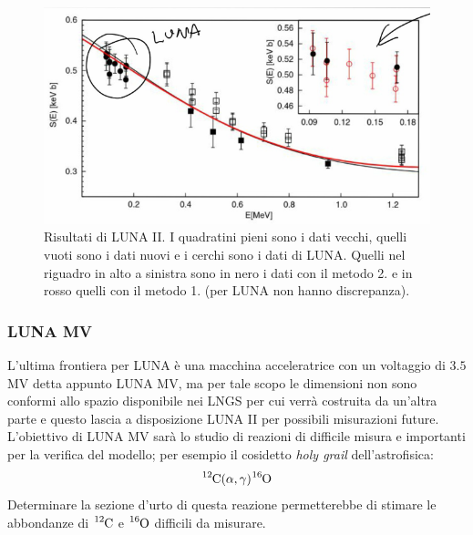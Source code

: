 \begin{figure}[!h]
	\centering
	\includegraphics[scale=0.7]{Immagini/0415_SE2.png}
	\caption{Risultati di LUNA II. I quadratini pieni sono i dati vecchi, quelli vuoti sono i dati nuovi e i cerchi sono i dati di LUNA. Quelli nel riguadro in alto a sinistra sono in nero i dati con il metodo 2. e in rosso quelli con il metodo 1. (per LUNA non hanno discrepanza).}
	\label{0415_lunaii}
\end{figure}

\subsubsection{LUNA MV}
L'ultima frontiera per LUNA è una macchina acceleratrice con un voltaggio di $3.5$ MV detta appunto LUNA MV, ma per tale scopo le dimensioni non sono conformi allo spazio disponibile nei LNGS per cui verrà costruita da un'altra parte e questo lascia a disposizione LUNA II per possibili misurazioni future. L'obiettivo di LUNA MV sarà lo studio di reazioni di difficile misura e importanti per la verifica del modello; per esempio il cosidetto \textit{holy grail} dell'astrofisica:
$$\ce{^{12}C(\alpha,\gamma)\ce{^{16}O}}$$
Determinare la sezione d'urto di questa reazione permetterebbe di stimare le abbondanze di $\ce{^{12}C}$ e $\ce{^{16}O}$ difficili da misurare.

